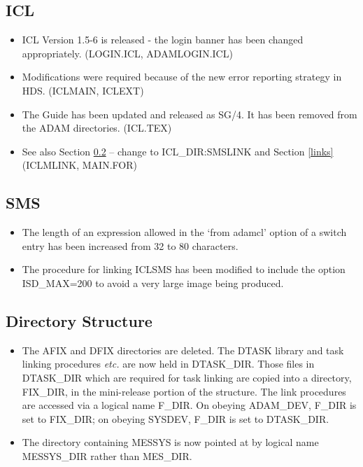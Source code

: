 \subsection{ICL}
\begin{itemize}
\item ICL Version 1.5-6 is released - the login banner has been changed
appropriately. (LOGIN.ICL, ADAMLOGIN.ICL)
\item Modifications were required because of the new error reporting strategy
in HDS. (ICLMAIN, ICLEXT)
\item The Guide has been updated and released as SG/4. It has been removed
from the ADAM directories. (ICL.TEX)
\item See also Section \ref{sms} -- change to ICL\_DIR:SMSLINK and Section 
\ref{links} (ICLMLINK, MAIN.FOR)
\end{itemize}

\subsection{SMS}
\label{sms}
\begin{itemize}
\item The length of an expression allowed in the `from adamcl' option of a 
switch entry has been increased from 32 to 80 characters.
\item The procedure for linking ICLSMS has been modified to include the option
ISD\_MAX=200 to avoid a very large image being produced.
\end{itemize}

\subsection{Directory Structure}
\begin{itemize}
\item The AFIX and DFIX directories are deleted.
The DTASK library and task linking procedures {\em etc.} are now held in
DTASK\_DIR.
Those files in DTASK\_DIR which are required for task linking are copied into
a directory, FIX\_DIR, in the mini-release portion of the structure.
The link procedures are accessed via a logical name F\_DIR.
On obeying ADAM\_DEV, F\_DIR is set to FIX\_DIR; on obeying SYSDEV, F\_DIR is
set to DTASK\_DIR.
\item The directory containing MESSYS is now pointed at by logical name 
MESSYS\_DIR rather than MES\_DIR.
\end{itemize}

